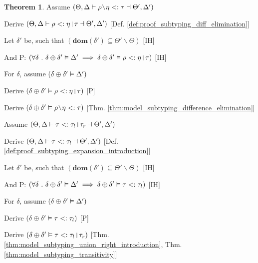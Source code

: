\documentclass[acmsmall]{acmart}
\theoremstyle{definition}
\newtheorem{theorem}{Theorem}[section]
\begin{document}
\begin{theorem}

  \item \N Assume $(
    \Theta, \Delta \entails 
    \rho \typdiff \eta \subtypes \tau \given \Theta', \Delta'
  )$
  \item \I \N Derive $(
    \Theta, \Delta \entails 
    \rho \subtypes \eta \J{|} \tau \given \Theta', \Delta'
  )$ [Def. \ref{def:proof_subtyping_diff_elimination}]

  \item \I \N Let $\delta'$ be, such that $(
    \textbf{dom}(\delta') \subseteq \Theta' \backslash \Theta
  )$ [IH]
  \item \I \N And P: $(
    \forall \delta \qua 
    \delta \oplus \delta' \satisfies \Delta' 
    \implies 
    \delta \oplus \delta' \satisfies \rho \subtypes \eta \J{|} \tau
  )$ [IH]
  \item \I \N For $\delta$, 
    assume $(\delta \oplus \delta' \vDash \Delta')$
  \item \I\I \N Derive $(
    \delta \oplus \delta' \satisfies \rho \subtypes \eta \J{|} \tau
  )$ [P]
  \item \I\I \N Derive $(
    \delta \oplus \delta' \satisfies \rho \typdiff \eta \subtypes \tau
  )$ [Thm. \ref{thm:model_subtyping_difference_elimination}]


  \item \N Assume $(
    \Theta, \Delta \entails \tau \subtypes \tau_{l}\J{|}\tau_{r} \given \Theta', \Delta' 
  )$
  \item \I \N Derive $(
    \Theta, \Delta \vdash \tau <: \tau_{l} \dashv \Theta', \Delta' 
  )$ [Def. \ref{def:proof_subtyping_expansion_introduction}]

  \item \I \N Let $\delta'$ be, such that $(
    \textbf{dom}(\delta') \subseteq \Theta' \backslash \Theta
  )$ [IH]
  \item \I \N And P: $(
    \forall \delta \ .\  
    \delta \oplus \delta' \vDash \Delta' 
    \implies 
    \delta \oplus \delta' \vDash \tau <: \tau_{l}
  )$ [IH]
  \item \I \N For $\delta$, 
    assume $(\delta \oplus \delta' \vDash \Delta')$
  \item \I\I \N Derive $(
    \delta \oplus \delta' \vDash \tau <: \tau_{l}
  )$ [P]
  \item \I\I \N Derive $(
    \delta \oplus \delta' \satisfies \tau \subtypes \tau_l \J{|} \tau_r
  )$ [Thm. \ref{thm:model_subtyping_union_right_introduction}, Thm. \ref{thm:model_subtyping_transitivity}]


\end{theorem}
\end{document}
